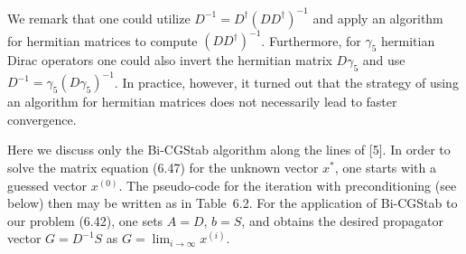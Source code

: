 We remark that one could utilize $D^{-1} = D^\dagger(D D^\dagger)^{-1}$ and
apply an algorithm for hermitian matrices to compute $(D D^\dagger)^{-1}$.
Furthermore, for $\gamma_5$ hermitian Dirac operators one could also invert the
hermitian matrix $D\gamma_5$ and use $D^{-1} = \gamma_5 (D\gamma_5)^{-1}$. In
practice, however, it turned out that the strategy of using an algorithm for
hermitian matrices does not necessarily lead to faster convergence.

Here we discuss only the Bi-CGStab algorithm along the lines of [5]. In order
to solve the matrix equation (6.47) for the unknown vector $x^*$, one starts
with a guessed vector $x^{(0)}$. The pseudo-code for the iteration with
preconditioning (see below) then may be written as in Table~6.2. For the
application of Bi-CGStab to our problem (6.42), one sets $A = D$, $b = S$, and
obtains the desired propagator vector $G = D^{-1}S$ as
$G = \lim_{i\to\infty} x^{(i)}$.

